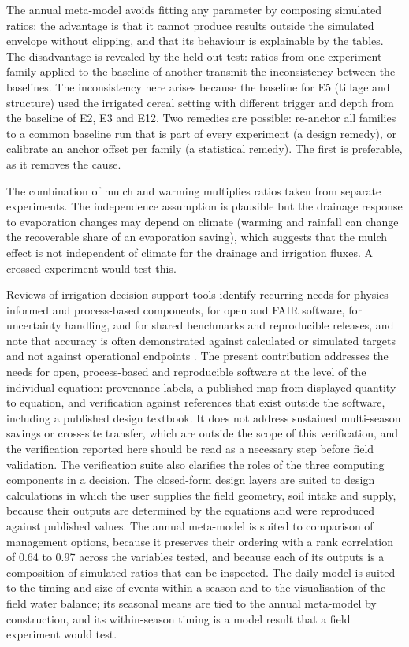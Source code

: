 \documentclass[preprint,12pt]{elsarticle}
\begin{document}
The annual meta-model avoids fitting any parameter by composing simulated ratios; the advantage is that it cannot produce results outside the simulated envelope without clipping, and that its behaviour is explainable by the tables. The disadvantage is revealed by the held-out test: ratios from one experiment family applied to the baseline of another transmit the inconsistency between the baselines. The inconsistency here arises because the baseline for E5 (tillage and structure) used the irrigated cereal setting with different trigger and depth from the baseline of E2, E3 and E12. Two remedies are possible: re-anchor all families to a common baseline run that is part of every experiment (a design remedy), or calibrate an anchor offset per family (a statistical remedy). The first is preferable, as it removes the cause.

The combination of mulch and warming multiplies ratios taken from separate experiments. The independence assumption is plausible but the drainage response to evaporation changes may depend on climate (warming and rainfall can change the recoverable share of an evaporation saving), which suggests that the mulch effect is not independent of climate for the drainage and irrigation fluxes. A crossed experiment would test this.


Reviews of irrigation decision-support tools identify recurring needs for physics-informed and process-based components, for open and FAIR software, for uncertainty handling, and for shared benchmarks and reproducible releases, and note that accuracy is often demonstrated against calculated or simulated targets and not against operational endpoints \cite{Umutoni2024,Zhang2021ERL}. The present contribution addresses the needs for open, process-based and reproducible software at the level of the individual equation: provenance labels, a published map from displayed quantity to equation, and verification against references that exist outside the software, including a published design textbook. It does not address sustained multi-season savings or cross-site transfer, which are outside the scope of this verification, and the verification reported here should be read as a necessary step before field validation. The verification suite also clarifies the roles of the three computing components in a decision. The closed-form design layers are suited to design calculations in which the user supplies the field geometry, soil intake and supply, because their outputs are determined by the equations and were reproduced against published values. The annual meta-model is suited to comparison of management options, because it preserves their ordering with a rank correlation of 0.64 to 0.97 across the variables tested, and because each of its outputs is a composition of simulated ratios that can be inspected. The daily model is suited to the timing and size of events within a season and to the visualisation of the field water balance; its seasonal means are tied to the annual meta-model by construction, and its within-season timing is a model result that a field experiment would test.
\end{document}
